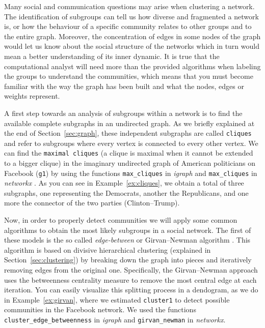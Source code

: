 Many social and communication questions may arise when clustering a network. The identification of subgroups can tell us how diverse and fragmented a network is, or how the behaviour of a specific community relates to other groups and to the entire graph. Moreover, the concentration of edges in some nodes of the graph would let us know about the social structure of the networks which in turn would mean a better understanding of its inner dynamic.  It is true that the computational analyst will need more than the provided algorithms when labeling the groups to understand the communities, which means that you must become familiar with the way the graph has been built and what the nodes, edges or weights represent.

A first step towards an analysis of subgroups within a network is to find the available complete subgraphs in an undirected graph. As we briefly explained at the end of Section~\ref{sec:graph}, these independent subgraphs are called \texttt{cliques} and refer to subgroups where every vertex is connected to every other vertex. We can find the \texttt{maximal cliques} (a clique is maximal when it cannot be extended to a  bigger clique) in the imaginary undirected graph of American politicians on Facebook (\texttt{g1}) by using the functions \texttt{max\_cliques} in \emph{igraph} \citep{eppstein2010listing} and \texttt{max\_cliques} in \emph{networkx} \citep{cazals2008note}. As you can see in Example~\ref{ex:cliques}, we obtain a total of three subgraphs, one representing the Democrats, another the Republicans, and one more the connector of the two parties (Clinton--Trump).


Now, in order to properly detect communities we will apply some common algorithms to obtain the most likely subgroups in a social network. The first of these models is the so called \emph{edge-between} or Girvan--Newman algorithm \citep{newman2004finding}. This algorithm is based on divisive hierarchical clustering (explained in Section~\ref{sec:clustering}) by breaking down the graph into pieces and iteratively removing edges from the original one. Specifically,  the Girvan--Newman approach uses the betweenness centrality measure to remove the most central edge at each iteration. You can easily visualize this splitting process in a dendogram, as we do in Example~\ref{ex:girvan}, where we estimated \texttt{cluster1} to detect possible communities in the Facebook network. We used the functions \texttt{cluster\_edge\_betweenness} in \emph{igraph} and \texttt{girvan\_newman} in \emph{networkx}.

